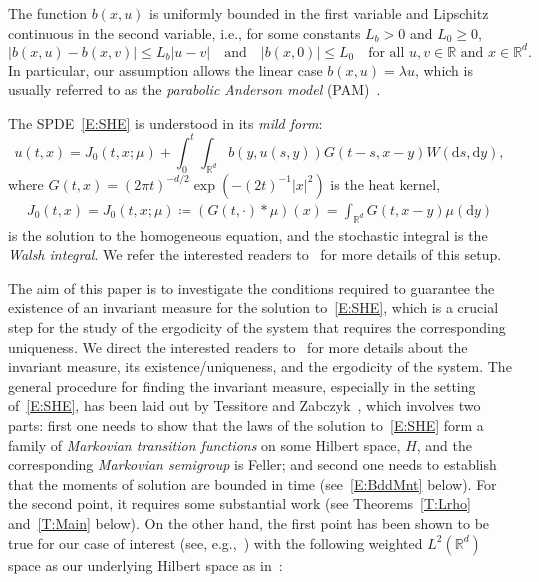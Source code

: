 \documentclass[sn-mathphys]{sn-jnl}%
\newcommand{\BR}{\mathbb{R}}
\newcommand{\ud}{\ensuremath{\mathrm{d}}}
\numberwithin{equation}{section}
\theoremstyle{thmstyleone}%
\theoremstyle{thmstyletwo}%
\theoremstyle{thmstylethree}%
\begin{document}
The function $b(x,u)$ is uniformly bounded in the first variable and Lipschitz continuous in the
second variable, i.e., for some constants $L_b>0$ and $L_0\ge 0$,
\begin{equation}\label{E:lipcon}
  \lvert b(x,u)-b(x,v) \rvert \le L_b \lvert u-v \rvert \quad \text{and} \quad
  \lvert b(x,0)\rvert         \le L_0       \quad \text{for all $u,v \in \BR$ and $x \in \BR^d.$ }
\end{equation}
In particular, our assumption allows the linear case $b(x,u) = \lambda u$, which is usually referred
to as the \textit{parabolic Anderson model} (PAM)~\cite{carmona.molchanov:94:parabolic}.

The SPDE~\eqref{E:SHE} is understood in its \textit{mild form}:
\begin{equation}\label{E:gmsol}
  u(t,x) = J_0(t,x;\mu)+ \int_0^t\int_{\BR^d}b(y,u(s,y))G(t-s,x-y)W(\ud s,\ud y),
\end{equation}
where $G(t,x) = (2 \pi t)^{-d/2}\exp\left(-\left(2t\right)^{-1}\lvert x\rvert^2\right)$ is the heat kernel,
\begin{gather}\label{E:Ju}
   J_0(t,x) = J_0(t,x;\mu) \coloneqq (G(t,\cdot) * \mu)(x) = \int_{\BR^d} G(t,x-y) \mu(\ud y)
\end{gather}
is the solution to the homogeneous equation, and the stochastic integral is the \textit{Walsh
integral}. We refer the interested readers
to~\cite{chen.kim:19:nonlinear,dalang.khoshnevisan.ea:09:minicourse,dalang:99:extending,walsh:86:introduction}
for more details of this setup. \bigskip

The aim of this paper is to investigate the conditions required to guarantee the existence of an
invariant measure for the solution to~\eqref{E:SHE}, which is a crucial step for the study of the
ergodicity of the system that requires the corresponding uniqueness. We direct the interested
readers to~\cite{cerrai:01:second,da-prato.zabczyk:96:ergodicity, da-prato.zabczyk:14:stochastic}
for more details about the invariant measure, its existence/uniqueness, and the ergodicity of the
system. The general procedure for finding the invariant measure, especially in the setting
of~\eqref{E:SHE}, has been laid out by Tessitore and Zabczyk~\cite{tessitore.zabczyk:98:invariant},
which involves two parts: first one needs to show that the laws of the solution to~\eqref{E:SHE}
form a family of \emph{Markovian transition functions} on some Hilbert space, $H$, and the
corresponding \emph{Markovian semigroup} is Feller; and second one needs to establish that the
moments of solution are bounded in time (see~\eqref{E:BddMnt} below). For the second point, it
requires some substantial work (see Theorems~\ref{T:Lrho} and~\ref{T:Main} below). On the other
hand, the first point has been shown to be true for our case of interest (see, e.g.,~\cite[Chapter
9]{da-prato.zabczyk:14:stochastic}) with the following weighted $L^2 (\BR^d)$ space as our underlying
Hilbert space as in~\cite{tessitore.zabczyk:98:invariant}:
\end{document}
